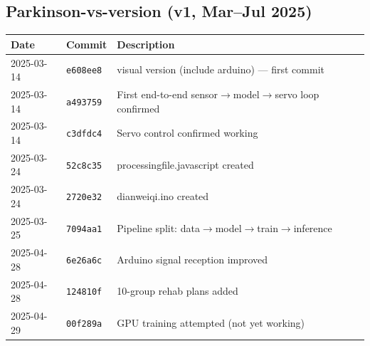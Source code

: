 \documentclass[12pt,a4paper]{article}
\begin{document}
\subsection*{Parkinson-vs-version (v1, Mar--Jul 2025)}
\begin{center}
\begin{tabular}{@{}p{2.5cm} p{2.0cm} p{9.0cm}@{}}
\toprule
\textbf{Date} & \textbf{Commit} & \textbf{Description} \\
\midrule
2025-03-14 & \texttt{e608ee8} & visual version (include arduino) --- first commit \\
2025-03-14 & \texttt{a493759} & First end-to-end sensor$\rightarrow$model$\rightarrow$servo loop confirmed \\
2025-03-14 & \texttt{c3dfdc4} & Servo control confirmed working \\
2025-03-24 & \texttt{52c8c35} & processingfile.javascript created \\
2025-03-24 & \texttt{2720e32} & dianweiqi.ino created \\
2025-03-25 & \texttt{7094aa1} & Pipeline split: data$\rightarrow$model$\rightarrow$train$\rightarrow$inference \\
2025-04-28 & \texttt{6e26a6c} & Arduino signal reception improved \\
2025-04-28 & \texttt{124810f} & 10-group rehab plans added \\
2025-04-29 & \texttt{00f289a} & GPU training attempted (not yet working) \\
\bottomrule
\end{tabular}
\end{center}
\end{document}
